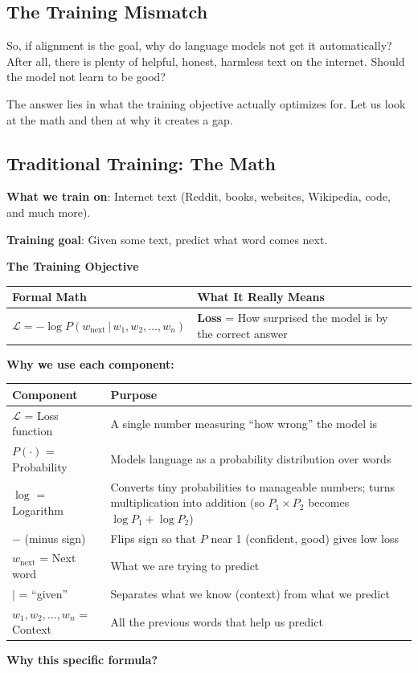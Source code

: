 \begin{chapterenv}
\section{The Training Mismatch}

So, if alignment is the goal, why do language models not get it automatically? After all, there is plenty of helpful, honest, harmless text on the internet. Should the model not learn to be good?

The answer lies in what the training objective actually optimizes for. Let us look at the math and then at why it creates a gap.

\subsection{Traditional Training: The Math}

\textbf{What we train on}: Internet text (Reddit, books, websites, Wikipedia, code, and much more).

\textbf{Training goal}: Given some text, predict what word comes next.

\begin{infobox}
\textbf{The Training Objective}

\begin{center}
\begin{tabular}{p{}p{}}
\toprule
\textbf{Formal Math} & \textbf{What It Really Means} \\
\midrule
$\mathcal{L} = -\log P(w_{\text{next}} \,|\, w_1, w_2, \ldots, w_n)$ & \textbf{Loss} = How surprised the model is by the correct answer \\
\bottomrule
\end{tabular}
\end{center}

\textbf{Why we use each component:}

\begin{center}
\begin{tabular}{p{}p{}}
\toprule
\textbf{Component} & \textbf{Purpose} \\
\midrule
$\mathcal{L}$ = Loss function & A single number measuring ``how wrong'' the model is \\
$P(\cdot)$ = Probability & Models language as a probability distribution over words \\
$\log$ = Logarithm & Converts tiny probabilities to manageable numbers; turns multiplication into addition (so $P_1 \times P_2$ becomes $\log P_1 + \log P_2$) \\
$-$ (minus sign) & Flips sign so that $P$ near 1 (confident, good) gives low loss \\
$w_{\text{next}}$ = Next word & What we are trying to predict \\
$|$ = ``given'' & Separates what we know (context) from what we predict \\
$w_1, w_2, \ldots, w_n$ = Context & All the previous words that help us predict \\
\bottomrule
\end{tabular}
\end{center}
\textbf{Why this specific formula?}


\end{infobox}
\end{chapterenv}

